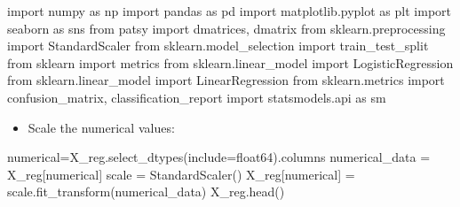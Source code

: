 \documentclass[
  11pt,
  letterpaper,
  DIV=11,
  numbers=noendperiod]{scrartcl}
\newenvironment{Shaded}{\begin{snugshade}}{\end{snugshade}}
\newcommand{\ImportTok}[1]{\textcolor[rgb]{0.00,0.46,0.62}{#1}}
\newcommand{\NormalTok}[1]{\textcolor[rgb]{0.00,0.23,0.31}{#1}}
\newcommand{\OperatorTok}[1]{\textcolor[rgb]{0.37,0.37,0.37}{#1}}
\newcommand{\StringTok}[1]{\textcolor[rgb]{0.13,0.47,0.30}{#1}}
\providecommand{\tightlist}{%
  \setlength{\itemsep}{0pt}\setlength{\parskip}{0pt}}\usepackage{longtable,booktabs,array}
\begin{document}
\begin{Shaded}
\begin{Highlighting}[]
\ImportTok{import}\NormalTok{ numpy }\ImportTok{as}\NormalTok{ np}
\ImportTok{import}\NormalTok{ pandas }\ImportTok{as}\NormalTok{ pd }
\ImportTok{import}\NormalTok{ matplotlib.pyplot }\ImportTok{as}\NormalTok{ plt}
\ImportTok{import}\NormalTok{ seaborn }\ImportTok{as}\NormalTok{ sns}
\ImportTok{from}\NormalTok{ patsy }\ImportTok{import}\NormalTok{ dmatrices, dmatrix}
\ImportTok{from}\NormalTok{ sklearn.preprocessing }\ImportTok{import}\NormalTok{ StandardScaler}
\ImportTok{from}\NormalTok{ sklearn.model\_selection }\ImportTok{import}\NormalTok{ train\_test\_split}
\ImportTok{from}\NormalTok{ sklearn }\ImportTok{import}\NormalTok{ metrics}
\ImportTok{from}\NormalTok{ sklearn.linear\_model }\ImportTok{import}\NormalTok{ LogisticRegression}
\ImportTok{from}\NormalTok{ sklearn.linear\_model }\ImportTok{import}\NormalTok{ LinearRegression}
\ImportTok{from}\NormalTok{ sklearn.metrics }\ImportTok{import}\NormalTok{ confusion\_matrix, classification\_report}
\ImportTok{import}\NormalTok{ statsmodels.api }\ImportTok{as}\NormalTok{ sm}
\end{Highlighting}
\end{Shaded}

\begin{itemize}
\tightlist
\item
  Scale the numerical values:
\end{itemize}

\begin{Shaded}
\begin{Highlighting}[]
\NormalTok{numerical}\OperatorTok{=}\NormalTok{X\_reg.select\_dtypes(include}\OperatorTok{=}\StringTok{\textquotesingle{}float64\textquotesingle{}}\NormalTok{).columns}
\NormalTok{numerical\_data }\OperatorTok{=}\NormalTok{ X\_reg[numerical]}
\NormalTok{scale }\OperatorTok{=}\NormalTok{ StandardScaler()}
\NormalTok{X\_reg[numerical] }\OperatorTok{=}\NormalTok{ scale.fit\_transform(numerical\_data)}
\NormalTok{X\_reg.head()}
\end{Highlighting}
\end{Shaded}
\end{document}

